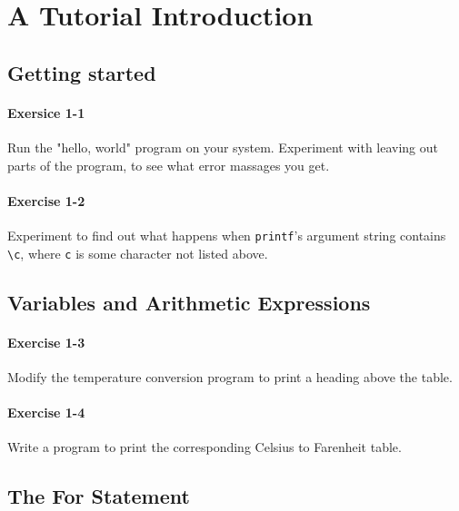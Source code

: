 \section{A Tutorial Introduction}
	\subsection{Getting started}
		\paragraph{Exersice 1-1}
			Run the "hello, world" program on your system. Experiment with leaving
			out parts of the program, to see what error massages you get.

			\hfill{}\cite[p.~8]{knr}
			

		\paragraph{Exercise 1-2}
			Experiment to find out what happens when \lstinline{printf}'s argument
			string contains \lstinline{\c}, where \lstinline{c} is some character
			not listed above.

			\hfill{}\cite[p.~8]{knr}
			

	\newpage
	\subsection{Variables and Arithmetic Expressions}
		\paragraph{Exercise 1-3}
			Modify the temperature conversion program to print a heading above the
			table.

			\hfill{}\cite[p.~13]{knr}
			

		\paragraph{Exercise 1-4}
			Write a program to print the corresponding Celsius to Farenheit table.

			\hfill{}\cite[p.~13]{knr}
			

	\newpage
	\subsection{The For Statement}
